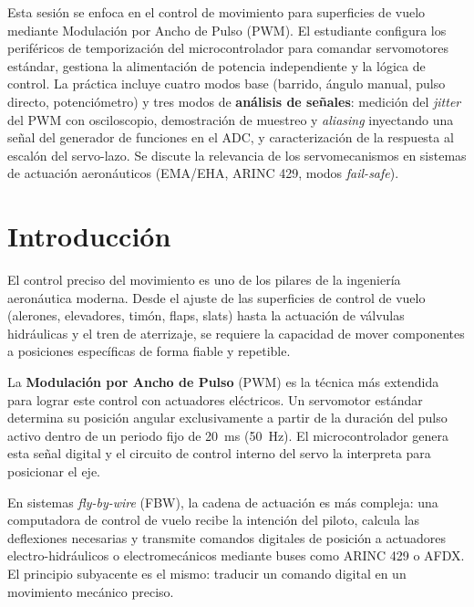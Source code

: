 \documentclass[11pt]{article}
\begin{document}
\portada

\begin{resumen}
Esta sesión se enfoca en el control de movimiento para superficies de vuelo mediante
Modulación por Ancho de Pulso (PWM). El estudiante configura los periféricos de
temporización del microcontrolador para comandar servomotores estándar, gestiona la
alimentación de potencia independiente y la lógica de control. La práctica incluye
cuatro modos base (barrido, ángulo manual, pulso directo, potenciómetro) y tres modos
de \textbf{análisis de señales}: medición del \emph{jitter} del PWM con osciloscopio,
demostración de muestreo y \emph{aliasing} inyectando una señal del generador de
funciones en el ADC, y caracterización de la respuesta al escalón del servo-lazo. Se
discute la relevancia de los servomecanismos en sistemas de actuación aeronáuticos
(EMA/EHA, ARINC 429, modos \emph{fail-safe}).
\end{resumen}

\tableofcontents
\newpage

\section{Introducción}

El control preciso del movimiento es uno de los pilares de la ingeniería aeronáutica
moderna. Desde el ajuste de las superficies de control de vuelo (alerones, elevadores,
timón, flaps, slats) hasta la actuación de válvulas hidráulicas y el tren de aterrizaje,
se requiere la capacidad de mover componentes a posiciones específicas de forma fiable y
repetible.

La \textbf{Modulación por Ancho de Pulso} (PWM) es la técnica más extendida para lograr
este control con actuadores eléctricos. Un servomotor estándar determina su posición
angular exclusivamente a partir de la duración del pulso activo dentro de un periodo
fijo de \SI{20}{\milli\second} (\SI{50}{\hertz}). El microcontrolador genera esta señal
digital y el circuito de control interno del servo la interpreta para posicionar el eje.

En sistemas \emph{fly-by-wire} (FBW), la cadena de actuación es más compleja: una
computadora de control de vuelo recibe la intención del piloto, calcula las deflexiones
necesarias y transmite comandos digitales de posición a actuadores electro-hidráulicos
o electromecánicos mediante buses como ARINC 429 o AFDX. El principio subyacente es el
mismo: traducir un comando digital en un movimiento mecánico preciso.
\end{document}

